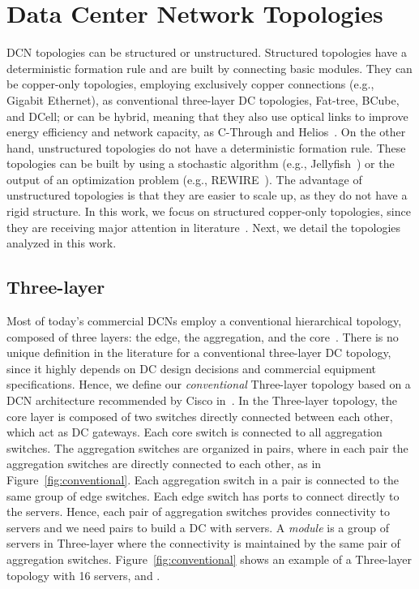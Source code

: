 \section{Data Center Network Topologies}
\label{sec:topologies}

DCN topologies can be structured or unstructured.
Structured topologies have a deterministic formation rule and are built by connecting basic modules. They can be copper-only topologies, employing exclusively copper connections (e.g., Gigabit Ethernet), as conventional three-layer DC topologies, Fat-tree, BCube, and DCell; or can be hybrid, meaning that they also use optical links to improve energy efficiency and network capacity, as C-Through and Helios~\cite{christoforos2012Optical}.
On the other hand, unstructured topologies do not have a deterministic formation rule. These topologies can be built by using a stochastic algorithm (e.g., Jellyfish~\cite{singla2012jellyfish}) or the output of an optimization problem (e.g., REWIRE~\cite{curtisrewire}). The advantage of unstructured topologies is that they are easier to scale up, as they do not have a rigid structure.
In this work, we focus on structured copper-only topologies, since they are receiving major attention in literature~\cite{raiciu2011improving,meng2010improving}. Next, we detail the topologies analyzed in this work.

\subsection{Three-layer}
\label{conventional}

Most of today's commercial DCNs employ a conventional hierarchical topology, composed of three layers: the edge, the aggregation, and the core~\cite{scotland}.
There is no unique definition in the literature for a conventional three-layer DC topology, since it highly depends on DC design decisions and commercial equipment specifications.
Hence, we define our \textit{conventional} Three-layer topology based on a DCN architecture recommended by Cisco in~\cite{scotland}. 
In the Three-layer topology, the core layer is composed of two switches directly connected between each other, which act as DC gateways. Each core switch is connected to all aggregation switches. The aggregation switches are organized in pairs, where in each pair the aggregation switches are directly connected to each other, as in Figure~\ref{fig:conventional}. Each aggregation switch in a pair is connected to the same group of  edge switches. Each edge switch has  ports to connect directly to the servers. Hence, each pair of aggregation switches provides connectivity to  servers and we need  pairs to build a DC with  servers. A \textit{module} is a group of servers in Three-layer where the connectivity is maintained by the same pair of aggregation switches.
Figure~\ref{fig:conventional} shows an example of a Three-layer topology with 16 servers,  and .

